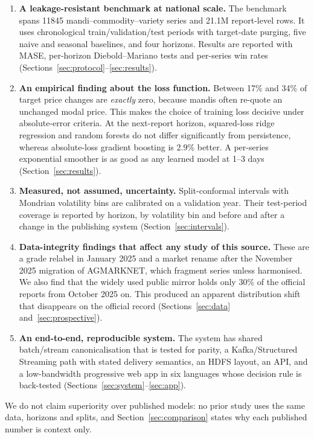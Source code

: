 \begin{enumerate}
  \item \textbf{A leakage-resistant benchmark at national scale.} The benchmark spans
    \num{11845} mandi--commodity--variety series and \num{21.1}M report-level rows.
    It uses chronological train/validation/test periods with target-date purging, five naive and seasonal baselines,
    and four horizons. Results are reported with MASE, per-horizon Diebold--Mariano tests and per-series win rates
    (Sections~\ref{sec:protocol}--\ref{sec:results}).
  \item \textbf{An empirical finding about the loss function.} Between 17\% and 34\% of target price changes
    are \emph{exactly} zero, because mandis often re-quote an unchanged modal price. This makes the choice of
    training loss decisive under absolute-error criteria. At the next-report horizon, squared-loss ridge regression and random forests
    do not differ significantly from persistence, whereas absolute-loss gradient boosting is 2.9\% better.
    A per-series exponential smoother is as good as any learned model at 1--3 days (Section~\ref{sec:results}).
  \item \textbf{Measured, not assumed, uncertainty.} Split-conformal intervals with Mondrian volatility bins are
    calibrated on a validation year. Their test-period coverage is reported by horizon, by volatility bin and before and after a
    change in the publishing system (Section~\ref{sec:intervals}).
  \item \textbf{Data-integrity findings that affect any study of this source.} These are a grade relabel in January 2025
    and a market rename after the November 2025 migration of AGMARKNET, which fragment series unless harmonised.
    We also find that the widely used public mirror holds only 30\% of the official reports from October 2025 on. This produced an apparent distribution shift that disappears on the official record (Sections~\ref{sec:data} and~\ref{sec:prospective}).
  \item \textbf{An end-to-end, reproducible system.} The system has shared batch/stream canonicalisation that is tested for parity,
    a Kafka/Structured Streaming path with stated delivery semantics, an HDFS layout, an API, and a
    low-bandwidth progressive web app in six languages whose decision rule is back-tested
    (Sections~\ref{sec:system}--\ref{sec:app}).
\end{enumerate}

We do not claim superiority over published models: no prior study uses the same data, horizons and splits,
and Section~\ref{sec:comparison} states why each published number is context only.
